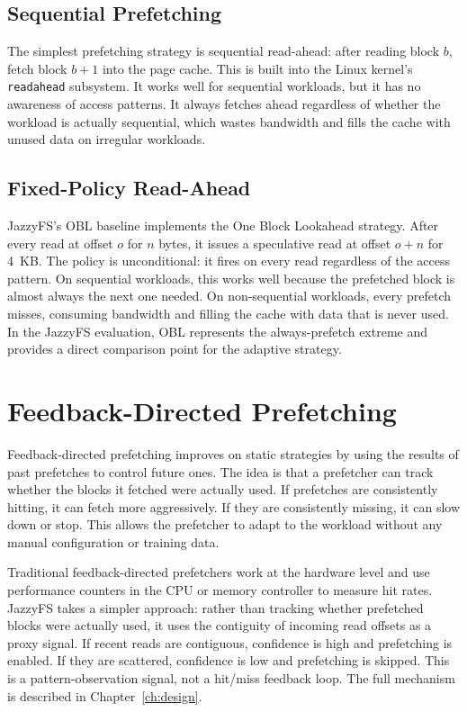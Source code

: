 \documentclass[12pt]{report}
\begin{document}
\subsection{Sequential Prefetching}

The simplest prefetching strategy is sequential read-ahead: after reading
block $b$, fetch block $b+1$ into the page cache. This is built into the
Linux kernel's \texttt{readahead} subsystem. It works well for sequential
workloads, but it has no awareness of access patterns. It always fetches
ahead regardless of whether the workload is actually sequential, which
wastes bandwidth and fills the cache with unused data on irregular
workloads.

\subsection{Fixed-Policy Read-Ahead}

JazzyFS's OBL baseline implements the One Block Lookahead strategy. After
every read at offset $o$ for $n$ bytes, it issues a speculative read at
offset $o + n$ for 4~KB. The policy is unconditional: it fires on every
read regardless of the access pattern. On sequential workloads, this works
well because the prefetched block is almost always the next one needed. On
non-sequential workloads, every prefetch misses, consuming bandwidth and
filling the cache with data that is never used. In the JazzyFS evaluation,
OBL represents the always-prefetch extreme and provides a direct comparison
point for the adaptive strategy.

\section{Feedback-Directed Prefetching}
\label{sec:bg-feedback}

Feedback-directed prefetching improves on static strategies by using the
results of past prefetches to control future ones. The idea is that a
prefetcher can track whether the blocks it fetched were actually used. If
prefetches are consistently hitting, it can fetch more aggressively. If they
are consistently missing, it can slow down or stop. This allows the
prefetcher to adapt to the workload without any manual configuration or
training data.

Traditional feedback-directed prefetchers work at the hardware level and
use performance counters in the CPU or memory controller to measure hit
rates. JazzyFS takes a simpler approach: rather than tracking whether
prefetched blocks were actually used, it uses the contiguity of incoming
read offsets as a proxy signal. If recent reads are contiguous, confidence
is high and prefetching is enabled. If they are scattered, confidence is
low and prefetching is skipped. This is a pattern-observation signal, not
a hit/miss feedback loop. The full mechanism is described in
Chapter~\ref{ch:design}.
\end{document}
